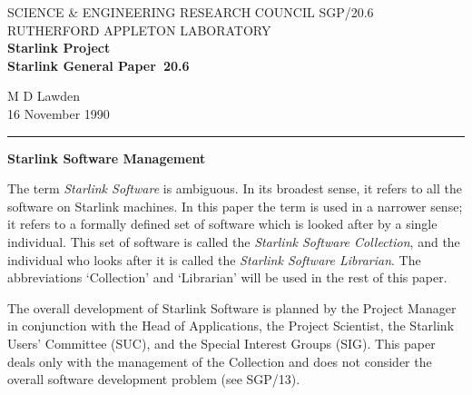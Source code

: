 \pagestyle{myheadings}

\newcommand{\stardoccategory}  {Starlink General Paper}
\newcommand{\stardocinitials}  {SGP}
\newcommand{\stardocnumber}    {20.6}
\newcommand{\stardocauthors}   {M D Lawden}
\newcommand{\stardocdate}      {16 November 1990}
\newcommand{\stardoctitle}     {Starlink Software Management}

\newcommand{\stardocname}{\stardocinitials /\stardocnumber}
\markright{\stardocname}
\setlength{\textwidth}{160mm}
\setlength{\textheight}{240mm}
\setlength{\topmargin}{-5mm}
\setlength{\oddsidemargin}{0mm}
\setlength{\evensidemargin}{0mm}
\setlength{\parindent}{0mm}
\setlength{\parskip}{\medskipamount}
\setlength{\unitlength}{1mm}


\thispagestyle{empty}
SCIENCE \& ENGINEERING RESEARCH COUNCIL \hfill \stardocname\\
RUTHERFORD APPLETON LABORATORY\\
{\large\bf Starlink Project\\}
{\large\bf \stardoccategory\ \stardocnumber}
\begin{flushright}
\stardocauthors\\
\stardocdate
\end{flushright}
\vspace{-4mm}
\rule{\textwidth}{0.5mm}
\vspace{5mm}
\begin{center}
{\Large\bf \stardoctitle}
\end{center}
\vspace{5mm}

The term {\em Starlink Software} is ambiguous.
In its broadest sense, it refers to all the software on Starlink machines.
In this paper the term is used in a narrower sense; it refers to a formally
defined set of software which is looked after by a single individual.
This set of software is called the {\em Starlink Software Collection}, and the
individual who looks after it is called the {\em Starlink Software Librarian}.
The abbreviations `Collection' and `Librarian' will be used in the rest of this
paper.

The overall development of Starlink Software is planned by the Project Manager
in conjunction with the Head of Applications, the Project Scientist, the
Starlink Users' Committee (SUC), and the Special Interest Groups (SIG).
This paper deals only with the management of the Collection and does not
consider the overall software development problem (see SGP/13).

